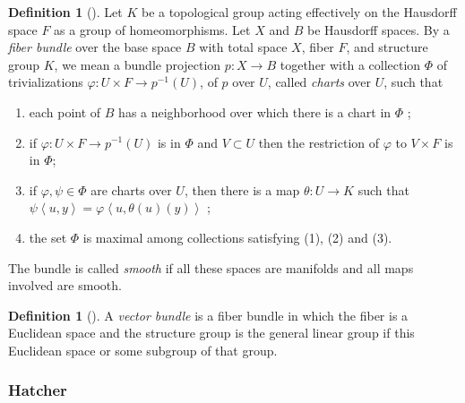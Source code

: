 \documentclass[reqno]{amsart}
\theoremstyle{definition}
\newtheorem{definition}[theorem]{Definition}
\theoremstyle{remark}
\begin{document}
\begin{definition}[]
    Let $K$ be a topological group acting effectively on
    the Hausdorff space $F$ as a group of homeomorphisms.
    Let $X$ and $B$ be Hausdorff spaces. By a 
    \textit{fiber bundle} over the base space $B$ with
    total space $X$, fiber $F$, and
    structure group $K$, we mean a bundle projection
    $p \colon X \to B$ together with a collection
    $\Phi $ of trivializations $\varphi \colon
    U \times F \to p^{-1}(U)$, of $p$ over $U$, called
    \textit{charts} over $U$, such that
    \begin{enumerate}
        \item each point of $B$ has a neighborhood
            over which there is a chart in $\Phi $ ;
        \item if $\varphi \colon U \times F \to 
            p^{-1}(U)$ is in $\Phi $ and
            $V \subset U$ then the restriction
            of $\varphi $ to $V \times F$ is in $\Phi$;
        \item if $\varphi, \psi \in \Phi$ are
            charts over $U$, then there is a map
            $\theta \colon U \to K$ such that
            $\psi \left<u,y \right> = 
            \varphi \left<u , \theta(u) (y) \right>$ ;
        \item the set $\Phi $ is maximal among
            collections satisfying (1), (2) and (3).
    \end{enumerate}

    The bundle is called \textit{smooth} if all these spaces
    are manifolds and all maps involved are smooth.
\end{definition}




\begin{definition}[]
    A \textit{vector bundle} is a fiber bundle
    in which the fiber is a Euclidean space
    and the structure group is the general linear group
    if this Euclidean space or some subgroup of that
    group.
\end{definition}

\subsubsection{Hatcher}
\end{document}
